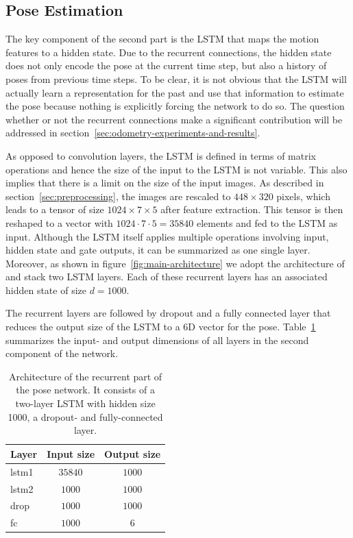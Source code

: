 		\subsection{Pose Estimation}
			The key component of the second part is the LSTM that maps the motion features to a hidden state.
			Due to the recurrent connections, the hidden state does not only encode the pose at the current time step, but also a history of poses from previous time steps.
			To be clear, it is not obvious that the LSTM will actually learn a representation for the past and use that information to estimate the pose because nothing is explicitly forcing the network to do so.
			The question whether or not the recurrent connections make a significant contribution will be addressed in section~\ref{sec:odometry-experiments-and-results}.
			
			As opposed to convolution layers, the LSTM is defined in terms of matrix operations and hence the size of the input to the LSTM is not variable.
			This also implies that there is a limit on the size of the input images.
			As described in section~\ref{sec:preprocessing}, the images are rescaled to $448 \times 320$ pixels, which leads to a tensor of size $1024 \times 7 \times 5$ after feature extraction.
			This tensor is then reshaped to a vector with $1024 \cdot 7 \cdot 5 = 35840$ elements and fed to the LSTM as input.
			Although the LSTM itself applies multiple operations involving input, hidden state and gate outputs, it can be summarized as one single layer.
			Moreover, as shown in figure~\ref{fig:main-architecture} we adopt the architecture of~\citeauthor{wang2017deepvo} and stack two LSTM layers.
			Each of these recurrent layers has an associated hidden state of size $d = 1000$.
			
			The recurrent layers are followed by dropout and a fully connected layer that reduces the output size of the LSTM to a 6D vector for the pose.
			Table~\ref{tbl:lstm_and_fc_after_flownet} summarizes the input- and output dimensions of all layers in the second component of the network.
			\begin{table}[tb]
				\small
				\begin{center}
					\begin{tabular}{|l|c|c|}
						\hline
						Layer 		& Input size 					& Output size			\\ \hline
						lstm1 		& $35840$						& $1000$  				\\ \hline
						lstm2 		& $1000$						& $1000$ 				\\ \hline
						drop		& $1000$						& $1000$				\\ \hline
						fc 			& $1000$						& $6$					\\ \hline
					\end{tabular}
				\end{center}
				\caption[Architecture of the recurrent part of the pose network]
						{Architecture of the recurrent part of the pose network.
						 It consists of a two-layer LSTM with hidden size 1000, a dropout- and fully-connected layer.}
				\label{tbl:lstm_and_fc_after_flownet}
			\end{table}
			
